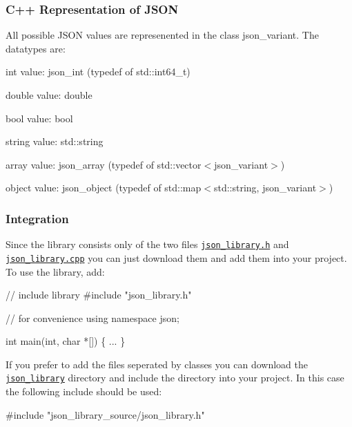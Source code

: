 \subsubsection*{\label{_cpp_representation_section}%
C++ Representation of J\+S\+ON}

All possible J\+S\+ON values are represenented in the class {\ttfamily json\+\_\+variant}. The datatypes are\+:
\begin{DoxyItemize}
\item int value\+: {\ttfamily json\+\_\+int} (typedef of {\ttfamily std\+::int64\+\_\+t})
\item double value\+: {\ttfamily double}
\item bool value\+: {\ttfamily bool}
\item string value\+: {\ttfamily std\+::string}
\item array value\+: {\ttfamily json\+\_\+array} (typedef of {\ttfamily std\+::vector$<$json\+\_\+variant$>$})
\item object value\+: {\ttfamily json\+\_\+object} (typedef of {\ttfamily std\+::map$<$std\+::string, json\+\_\+variant$>$})
\end{DoxyItemize}

\subsubsection*{\label{_integration_section}%
Integration}

Since the library consists only of the two files \href{https://github.com/n0dex/cppjsonlib/blob/master/json_library.h}{\tt json\+\_\+library.\+h} and \href{https://github.com/n0dex/cppjsonlib/blob/master/json_library.cpp}{\tt json\+\_\+library.\+cpp} you can just download them and add them into your project. To use the library, add\+: 
\begin{DoxyCode}
\textcolor{comment}{// include library}
\textcolor{preprocessor}{#include "json\_library.h"}

\textcolor{comment}{// for convenience}
\textcolor{keyword}{using namespace }json;

\textcolor{keywordtype}{int} main(\textcolor{keywordtype}{int}, \textcolor{keywordtype}{char} *[]) \{
    ...
\}
\end{DoxyCode}


If you prefer to add the files seperated by classes you can download the \href{https://github.com/n0dex/cppjsonlib/tree/master/json_library_source}{\tt json\+\_\+library} directory and include the directory into your project. In this case the following include should be used\+: 
\begin{DoxyCode}
\textcolor{preprocessor}{#include "json\_library\_source/json\_library.h"}
\end{DoxyCode}
